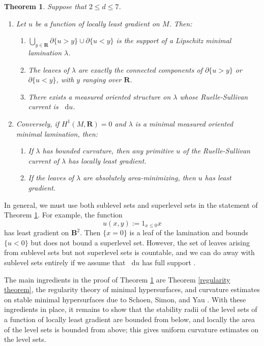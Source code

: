 \documentclass[reqno,11pt]{amsart}
\newcommand{\RR}{\mathbf{R}}
\newcommand{\Ball}{\mathbf{B}}
\newcommand*\dif{\mathop{}\!\mathrm{d}}
\newtheorem{mainthm}{Theorem}
\theoremstyle{definition}
\numberwithin{equation}{section}
\begin{document}
\begin{mainthm}\label{main thm}
Suppose that $2 \leq d \leq 7$.
\begin{enumerate}
\item Let $u$ be a function of locally least gradient on $M$.
Then:
\begin{enumerate}
\item $\bigcup_{y \in \RR} \partial \{u > y\} \cup \partial \{u < y\}$ is the support of a Lipschitz minimal lamination $\lambda$.
\item The leaves of $\lambda$ are exactly the connected components of $\partial \{u > y\}$ or $\partial \{u < y\}$, with $y$ ranging over $\RR$.
\item There exists a measured oriented structure on $\lambda$ whose Ruelle-Sullivan current is $\dif u$.
\end{enumerate}
\item Conversely, if $H^1(M, \RR) = 0$ and $\lambda$ is a minimal measured oriented minimal lamination, then:
\begin{enumerate}
\item If $\lambda$ has bounded curvature, then any primitive $u$ of the Ruelle-Sullivan current of $\lambda$ has locally least gradient.
\item If the leaves of $\lambda$ are absolutely area-minimizing, then $u$ has least gradient.
\end{enumerate}
\end{enumerate}
\end{mainthm}

In general, we must use both sublevel sets and superlevel sets in the statement of Theorem \ref{main thm}.
For example, the function
$$u(x, y) := 1_{x \leq 0} x$$
has least gradient on $\Ball^2$.
Then $\{x = 0\}$ is a leaf of the lamination and bounds $\{u < 0\}$ but does not bound a superlevel set.
However, the set of leaves arising from sublevel sets but not superlevel sets is countable, and we can do away with sublevel sets entirely if we assume that $\dif u$ has full support \cite[Lemma 2.11]{górny2018}.

The main ingredients in the proof of Theorem \ref{main thm} are Theorem \ref{regularity theorem}, the regularity theory of minimal hypersurfaces, and curvature estimates on stable minimal hypersurfaces due to Schoen, Simon, and Yau \cite{Schoen75,Schoen81}.
With these ingredients in place, it remains to show that the stability radii of the level sets of a function of locally least gradient are bounded from below, and locally the area of the level sets is bounded from above; this gives uniform curvature estimates on the level sets.
\end{document}
